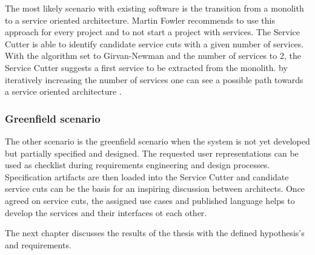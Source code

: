 The most likely scenario with existing software is the transition from a monolith to a service oriented architecture. Martin Fowler recommends to use this approach for every project and to not start a project with services\cite{fowlerMonolithFirst}. The Service Cutter is able to identify candidate service cuts with a given number of services. With the algorithm set to Girvan-Newman and the number of services to 2, the Service Cutter suggests a first service to be extracted from the monolith. by iteratively increasing the number of services one can see a possible path towards a service oriented architecture .

\subsubsection{Greenfield scenario}

The other scenario is the greenfield scenario when the system is not yet developed but partially specified and designed. The requested user representations can be used as checklist during requirements engineering and design processes. Specification artifacts are then loaded into the Service Cutter and candidate service cuts can be the basis for an inspiring discussion between architects. Once agreed on service cuts, the assigned use cases and published language helps to develop the services and their interfaces ot each other. 

\bigskip
The next chapter discusses the results of the thesis with the defined hypothesis's and requirements. 
